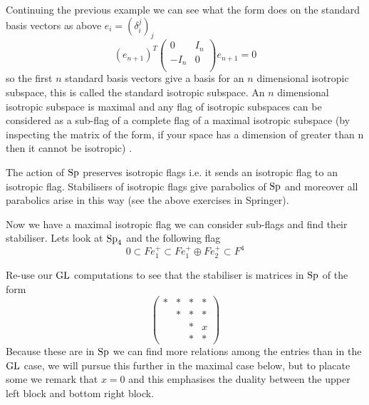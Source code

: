 \begin{example}
    Continuing the previous example we can see what the form does on the standard basis vectors as above \(e_i = (\delta_i^j)_{j}\)
        \[(e_{n+1})^T\begin{pmatrix}
            0 & I_n \\
            -I_n & 0\\
        \end{pmatrix}e_{n+1} = 0\] 
        so the first \(n\) standard basis vectors give a basis for an \(n\) dimensional isotropic subspace, this is called the standard isotropic subspace. An \(n\) dimensional isotropic subspace is maximal and any flag of isotropic subspaces can be considered as a sub-flag of a complete flag of a maximal isotropic subspace (by inspecting the matrix of the form, if your space has a dimension of greater than n then it cannot be isotropic) \cite[\S 8]{BuildingsClassicalGroups}.
\end{example}

The action of \(\operatorname{Sp}\) preserves isotropic flags i.e. it sends an isotropic flag to an isotropic flag. Stabilisers of isotropic flags give parabolics of \(\operatorname{Sp}\) and moreover all parabolics arise in this way (see the above exercises in Springer).

\begin{example}
        Now we have a maximal isotropic flag we can consider sub-flags and find their stabiliser. Lets look at \(\operatorname{Sp}_4\) and the following flag
        \[0 \subset Fe_1^+ \subset Fe_1^+ \oplus Fe^+_2 \subset F^4\]

        Re-use our \(\operatorname{GL}\) computations to see that the stabiliser is matrices in \(\operatorname{Sp}\) of the form
        \[\begin{pmatrix}
            *&*&*&* \\
             &*&*&* \\
             && *&x \\
             && *& *
        \end{pmatrix}\]
        Because these are in \(\operatorname{Sp}\) we can find more relations among the entries than in the \(\operatorname{GL}\) case, we will pursue this further in the maximal case below, but to placate some we remark that \(x = 0\) and this emphasises the duality between the upper left block and bottom right block.
    \end{example}

